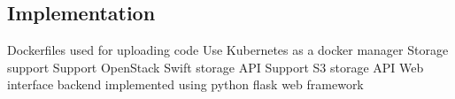 \documentclass{sig-alternate-05-2015}
\begin{document}
\subsection{Implementation}
Dockerfiles used for uploading code
Use Kubernetes as a docker manager
Storage support
Support OpenStack Swift storage API
Support S3 storage API
Web interface
backend implemented using python flask web framework


 
\end{document}
